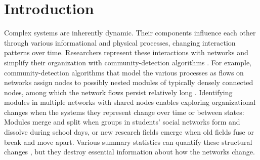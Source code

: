 \documentclass[aps,rmp,floats,floatfix,twocolumn,superscriptaddress,final]{revtex4-2}
\begin{document}


\section*{Introduction}

Complex systems are inherently dynamic.
Their components influence each other through various informational and physical processes, changing interaction patterns over time.
Researchers represent these interactions with networks \cite{edler2017infomap,calatayud2020positive,farage2021identifying,joaquin2021regularities,neuman2022pisa,edler2022infomap,rojas2022natural}
and simplify their organization with community-detection algorithms \cite{rosvall2008maps,fortunato2010community,schaub2017many,traag2019louvain,peixoto2019bayesian}.
For example, community-detection algorithms that model the various processes as flows on networks assign nodes to possibly nested modules of typically densely connected nodes, among which the network flows persist relatively long \cite{rosvall2008maps}. 
Identifying modules in multiple networks with shared nodes enables exploring organizational changes when the systems they represent change over time or between states: Modules merge and split when groups in students' social networks form and dissolve during school days, or new research fields emerge when old fields fuse or break and move apart. 
Various summary statistics can quantify these structural changes \cite{danon2005comparing,amelio2017correction,newman2020improved}, but they destroy essential information about how the networks change.
\end{document}
